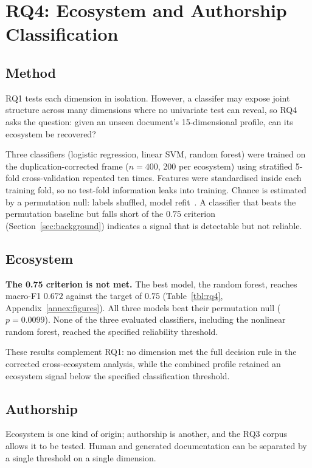 \documentclass[conference]{IEEEtran}
\begin{document}
\section{RQ4: Ecosystem and Authorship Classification}
\label{sec:rq4}

\subsection{Method}

RQ1 tests each dimension in isolation. However, a classifer may expose joint structure across many dimensions where no univariate test can reveal, so RQ4 asks the question: given an unseen document's 15-dimensional profile, can its ecosystem be recovered?

Three classifiers (logistic regression, linear SVM, random forest) were trained on the duplication-corrected frame ($n=400$, 200 per ecosystem) using stratified 5-fold cross-validation repeated ten times. Features were standardised inside each training fold, so no test-fold information leaks into training. Chance is estimated by a permutation null: labels shuffled, model refit~\cite{ojala2010}. A classifier that beats the permutation baseline but falls short of the $0.75$ criterion (Section~\ref{sec:background}) indicates a signal that is detectable but not reliable.

\subsection{Ecosystem}

\textbf{The 0.75 criterion is not met.} The best model, the random forest, reaches macro-F1 $0.672$ against the target of $0.75$ (Table~\ref{tbl:rq4}, Appendix~\ref{annex:figures}).  All three models beat their permutation null ($p = 0.0099$). None of the three evaluated classifiers, including the nonlinear random forest, reached the specified reliability threshold.

These results complement RQ1: no dimension met the full decision rule in the corrected cross-ecosystem analysis, while the combined profile retained an ecosystem signal below the specified classification threshold.
\subsection{Authorship}

Ecosystem is one kind of origin; authorship is another, and the RQ3 corpus allows it to be tested. Human and generated documentation can be separated by a single threshold on a single dimension.
\end{document}
